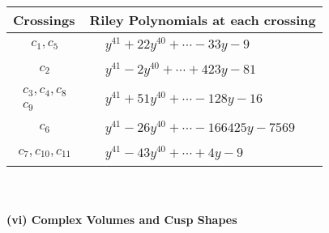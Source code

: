 \documentclass[1p]{elsarticle_modified}
\theoremstyle{definition}
\begin{document}
\begin{tabular}{m{50pt}|m{274pt}}
Crossings & \hspace{64pt}Riley Polynomials at each crossing \\
\hline $$\begin{aligned}c_{1},c_{5}\end{aligned}$$&$\begin{aligned}
&y^{41}+22 y^{40}+\cdots-33 y-9
\end{aligned}$\\
\hline $$\begin{aligned}c_{2}\end{aligned}$$&$\begin{aligned}
&y^{41}-2 y^{40}+\cdots+423 y-81
\end{aligned}$\\
\hline $$\begin{aligned}c_{3},c_{4},c_{8}\\c_{9}\end{aligned}$$&$\begin{aligned}
&y^{41}+51 y^{40}+\cdots-128 y-16
\end{aligned}$\\
\hline $$\begin{aligned}c_{6}\end{aligned}$$&$\begin{aligned}
&y^{41}-26 y^{40}+\cdots-166425 y-7569
\end{aligned}$\\
\hline $$\begin{aligned}c_{7},c_{10},c_{11}\end{aligned}$$&$\begin{aligned}
&y^{41}-43 y^{40}+\cdots+4 y-9
\end{aligned}$\\
\hline
\end{tabular}\\~\\
\newpage\flushleft \textbf{(vi) Complex Volumes and Cusp Shapes}
\end{document}
